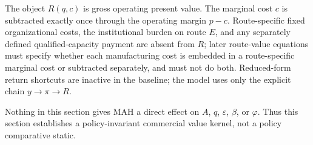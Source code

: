 The object \(R(q,c)\) is gross operating present value. The marginal cost
\(c\) is subtracted exactly once through the operating margin \(p-c\).
Route-specific fixed organizational costs, the institutional burden on route
\(E\), and any separately defined qualified-capacity payment are absent from
\(R\); later route-value equations must specify whether each manufacturing
cost is embedded in a route-specific marginal cost or subtracted separately,
and must not do both. Reduced-form return shortcuts are inactive in the
baseline; the model uses only the explicit chain
\(y\rightarrow\pi\rightarrow R\).

Nothing in this section gives MAH a direct effect on \(A\), \(q\),
\(\varepsilon\), \(\beta\), or \(\varphi\). Thus this section establishes a
policy-invariant commercial value kernel, not a policy comparative static.
